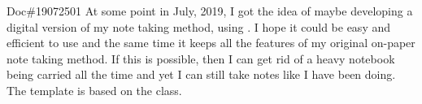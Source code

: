 \documentclass{flownotes}
\begin{document}
\begin{notebox}{Doc\#19072501}
At some point in July, 2019,
I got the idea of maybe  developing a digital version of my note taking method,
using \XeLaTeX.
I hope it could be easy and efficient to use and the same time it keeps all the features of my original on-paper note taking method.
If this is possible, then I can get rid of a heavy notebook being carried all the time and yet I can still take notes like I have been doing.
\tcbline
The template is based on the  class.
{\centering
{}}
\end{notebox}
\end{document}
